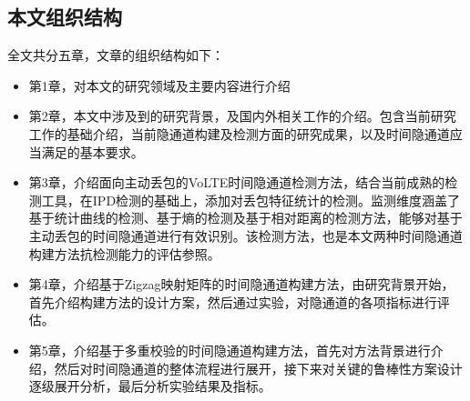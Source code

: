 \subsection{本文组织结构}
\label{sec:intro:work:struct}

全文共分五章，文章的组织结构如下：
\begin{itemize}
    \item 第1章，对本文的研究领域及主要内容进行介绍
    \item 第2章，本文中涉及到的研究背景，及国内外相关工作的介绍。包含当前研究工作的基础介绍，当前隐通道构建及检测方面的研究成果，以及时间隐通道应当满足的基本要求。
    \item 第3章，介绍面向主动丢包的VoLTE时间隐通道检测方法，结合当前成熟的检测工具，在IPD检测的基础上，添加对丢包特征统计的检测。监测维度涵盖了基于统计曲线的检测、基于熵的检测及基于相对距离的检测方法，能够对基于主动丢包的时间隐通道进行有效识别。该检测方法，也是本文两种时间隐通道构建方法抗检测能力的评估参照。
    \item 第4章，介绍基于Zigzag映射矩阵的时间隐通道构建方法，由研究背景开始，首先介绍构建方法的设计方案，然后通过实验，对隐通道的各项指标进行评估。
    \item 第5章，介绍基于多重校验的时间隐通道构建方法，首先对方法背景进行介绍，然后对时间隐通道的整体流程进行展开，接下来对关键的鲁棒性方案设计逐级展开分析，最后分析实验结果及指标。
\end{itemize}
